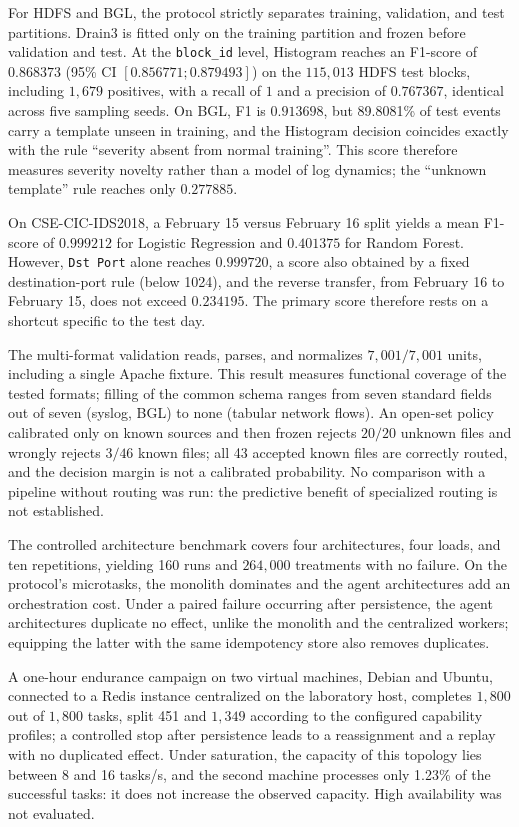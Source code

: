 For HDFS and BGL, the protocol strictly separates training, validation, and
test partitions. Drain3 is fitted only on the training partition and frozen
before validation and test. At the \texttt{block\_id} level, Histogram reaches
an F1-score of $0.868373$ (95\% CI $[0.856771;0.879493]$) on the
$115{,}013$ HDFS test blocks, including $1{,}679$ positives, with a recall of
$1$ and a precision of $0.767367$, identical across five sampling seeds. On
BGL, F1 is $0.913698$, but 89.8081\% of test events carry a template unseen
in training, and the Histogram decision coincides exactly with the rule
``severity absent from normal training''. This score therefore measures
severity novelty rather than a model of log dynamics; the ``unknown
template'' rule reaches only $0.277885$.

On CSE-CIC-IDS2018, a February 15 versus February 16 split yields a mean
F1-score of $0.999212$ for Logistic Regression and $0.401375$ for Random
Forest. However, \texttt{Dst Port} alone reaches $0.999720$, a score also
obtained by a fixed destination-port rule (below 1024), and the reverse
transfer, from February 16 to February 15, does not exceed $0.234195$. The
primary score therefore rests on a shortcut specific to the test day.

The multi-format validation reads, parses, and normalizes $7{,}001/7{,}001$
units, including a single Apache fixture. This result measures functional
coverage of the tested formats; filling of the common schema ranges from seven
standard fields out of seven (syslog, BGL) to none (tabular network flows). An
open-set policy calibrated only on known sources and then frozen rejects
$20/20$ unknown files and wrongly rejects $3/46$ known files; all 43 accepted
known files are correctly routed, and the decision margin is not a calibrated
probability. No comparison with a pipeline without routing was run: the
predictive benefit of specialized routing is not established.

The controlled architecture benchmark covers four architectures, four loads,
and ten repetitions, yielding 160 runs and $264{,}000$ treatments with no
failure. On the protocol's microtasks, the monolith dominates and the agent
architectures add an orchestration cost. Under a paired failure occurring
after persistence, the agent architectures duplicate no effect, unlike the
monolith and the centralized workers; equipping the latter with the same
idempotency store also removes duplicates.

A one-hour endurance campaign on two virtual machines, Debian and Ubuntu,
connected to a Redis instance centralized on the laboratory host, completes
$1{,}800$ out of $1{,}800$ tasks, split 451 and $1{,}349$ according to the
configured capability profiles; a controlled stop after persistence leads to
a reassignment and a replay with no duplicated effect. Under saturation, the
capacity of this topology lies between 8 and 16 tasks/s, and the second
machine processes only 1.23\% of the successful tasks: it does not increase
the observed capacity. High availability was not evaluated.

